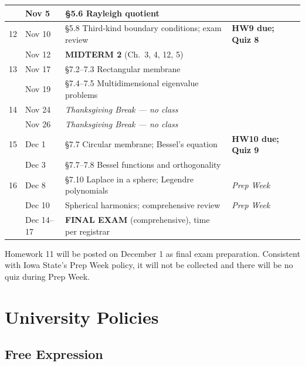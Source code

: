 \documentclass[11pt]{amsart}
\begin{document}
\begin{raggedright}
\begin{longtable}{@{}l l >{\raggedright\arraybackslash}p{2.9in} >{\raggedright\arraybackslash}p{1.35in}@{}}
   & Nov 5  & \S5.6 Rayleigh quotient & \\
\hline
12 & Nov 10 & \S5.8 Third-kind boundary conditions; exam review & \textbf{HW9 due; Quiz 8} \\
   & Nov 12 & \textbf{MIDTERM 2} (Ch.\ 3, 4, 12, 5) & \\
\hline
13 & Nov 17 & \S7.2--7.3 Rectangular membrane & \\
   & Nov 19 & \S7.4--7.5 Multidimensional eigenvalue problems & \\
\hline
14 & Nov 24 & \textit{Thanksgiving Break --- no class} & \\
   & Nov 26 & \textit{Thanksgiving Break --- no class} & \\
\hline
15 & Dec 1  & \S7.7 Circular membrane; Bessel's equation & \textbf{HW10 due; Quiz 9} \\
   & Dec 3  & \S7.7--7.8 Bessel functions and orthogonality & \\
\hline
16 & Dec 8  & \S7.10 Laplace in a sphere; Legendre polynomials & \textit{Prep Week} \\
   & Dec 10 & Spherical harmonics; comprehensive review & \textit{Prep Week} \\
\hline
   & Dec 14--17 & \textbf{FINAL EXAM} (comprehensive), time per registrar & \\
\hline
\end{longtable}

\vspace{0.1in}

Homework 11 will be posted on December 1 as final exam preparation.  Consistent with
Iowa State's Prep Week policy, it will not be collected and there will be no quiz
during Prep Week.

\newpage

\section{University Policies}

\subsection{Free Expression}


\end{raggedright}
\end{document}
